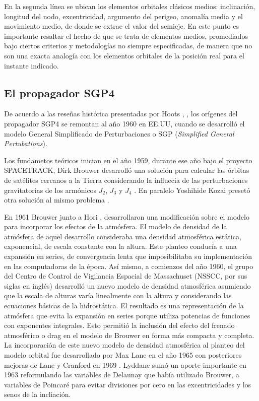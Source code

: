 {En la segunda l\'inea se ubican los elementos orbitales cl\'asicos medios: inclinaci\'on, longitud del nodo, excentricidad, argumento del perigeo, anomal\'ia media y el movimiento medio, de donde se extrae el valor del semieje. En este punto es importante resaltar el hecho de que se trata de elementos medios, promediados bajo ciertos criterios y metodologías no siempre especificadas, de manera que no son una exacta analog\'ia con los elementos orbitales de la posici\'on real para el instante indicado.

\subsection{El propagador SGP4}\label{subsec:sgp4model}
De acuerdo a las rese\~nas hist\'orica presentadas por Hoots \citep{hootshistoria}, \citep{hoots2004history}, los or\'igenes del propagador SGP4 se remontan al a\~no 1960 en EE.UU, cuando se desarroll\'o el modelo General Simplificado de Perturbaciones o SGP ({\it{Simplified General Pertubations}}).

Los fundametos te\'oricos inician en el a\~no 1959, durante ese a\~no bajo el proyecto SPACETRACK, Dirk Brouwer desarroll\'o una soluci\'on para calcular las \'orbitas de sat\'elites cercanos a la Tierra considerando la influecia de las perturbaciones gravitatorias de los arm\'onicos $J_{2}$, $J_{3}$ y $J_{4}$ \citep{brouwer1959solution}. En paralelo Yoshihide Kozai preset\'o otra soluci\'on al mismo problema \citep{kozai1962second}.

En 1961 Brouwer junto a Hori \citep{brouwer1961theoretical}, desarrollaron una modificaci\'on sobre el modelo para incorporar los efectos de la atm\'osfera. El modelo de densidad de la atm\'osfera de aquel desarrollo consideraba una densidad atmosf\'erica est\'atica, exponencial, de escala constante con la altura. Este planteo conduc\'ia a una expansi\'on en series, de convergencia lenta que imposibilitaba su implementaci\'on en las computadoras de la \'epoca. As\'i mismo, a comienzos del a\~no 1960, el grupo del Centro de Control de Vigilancia Espacial de Massachuset (NSSCC, por sus siglas en ingl\'es) desarroll\'o un nuevo modelo de densidad atmosf\'erica asumiendo que la escala de alturas var\'ia linealmente con la altura y considerando las ecuaciones b\'asicas de la hidrost\'atica. El resultado es una representaci\'on de la atm\'osfera que evita la expansi\'on en series porque utiliza potencias de funciones con exponentes integrales. Esto permiti\'o la inclusi\'on del efecto del frenado atmosf\'erico o drag en el modelo de Brouwer en forma m\'as compacta y completa. La incorporaci\'on de este nuevo modelo de densidad atmosf\'erica al planteo del modelo orbital fue desarrollado por Max Lane en el a\~no 1965 \citep{lane1965development} con posteriores mejoras de Lane y Cranford en 1969 \citep{cranfordimproved}. Lyddane \citep{lyddane1963small} sum\'o un aporte importante en 1963 reformulando las variables de Delaunay que hab\'ia utilizado Brouwer, a variables de Poincar\'e para evitar divisiones por cero en las excentricidades y los senos de la incliaci\'on.

}
